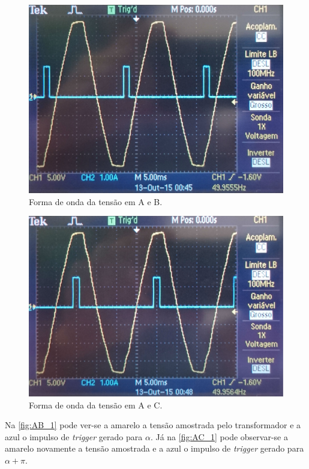 \documentclass[a4paper,11pt]{article}
\numberwithin{equation}{section}
\begin{document}
\begin{figure}[H]
	\centering
	\includegraphics[keepaspectratio=true, scale=0.11]{img/figs/AB_1}
	\caption{Forma de onda da tensão em A e B.}
	\label{fig:AB_1}
	\vspace{-0.8em}
\end{figure}

\begin{figure}[H]
	\centering
	\includegraphics[keepaspectratio=true, scale=0.1]{img/figs/AC_1}
	\caption{Forma de onda da tensão em A e C.}
	\label{fig:AC_1}
	\vspace{-0.8em}
\end{figure}

Na \autoref{fig:AB_1} pode ver-se a amarelo a tensão amostrada pelo transformador e a azul o impulso de \textit{trigger} gerado para $\alpha$. Já na \autoref{fig:AC_1} pode observar-se a amarelo novamente a tensão amostrada e a azul o impulso de \textit{trigger} gerado para $\alpha + \pi$.
\end{document}
